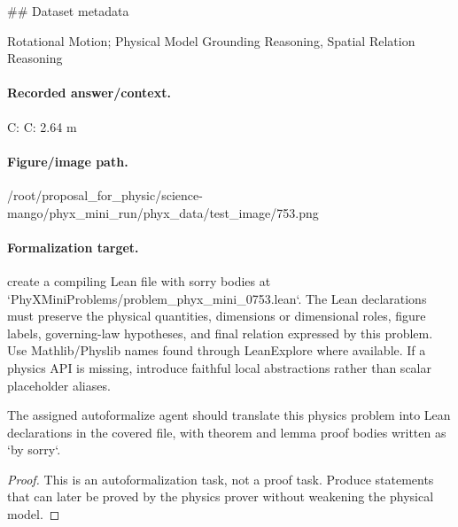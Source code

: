 \#\# Dataset metadata

Rotational Motion; Physical Model Grounding Reasoning, Spatial Relation Reasoning

\paragraph{Recorded answer/context.}
C: C: 2.64 m

\paragraph{Figure/image path.}
/root/proposal\_for\_physic/science-mango/phyx\_mini\_run/phyx\_data/test\_image/753.png

\paragraph{Formalization target.}
create a compiling Lean file with sorry bodies at `PhyXMiniProblems/problem\_phyx\_mini\_0753.lean`. The Lean declarations must preserve the physical quantities, dimensions or dimensional roles, figure labels, governing-law hypotheses, and final relation expressed by this problem.
Use Mathlib/Physlib names found through LeanExplore where available. If a physics API is missing, introduce faithful local abstractions rather than scalar placeholder aliases.

\begin{theorem}
\label{thm:physics:phyx_mini_0753:target}
The assigned autoformalize agent should translate this physics problem into Lean declarations in the covered file, with theorem and lemma proof bodies written as `by sorry`.
\end{theorem}
\begin{proof}
This is an autoformalization task, not a proof task. Produce statements that can later be proved by the physics prover without weakening the physical model.
\end{proof}

